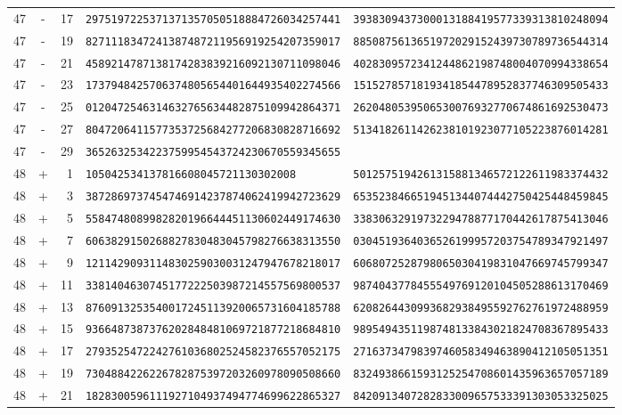\begin{longtable}{@{}rcrll@{}}
47&-&17&\texttt{2975197225371371357050518884726034257441}&\texttt{3938309437300013188419577339313810248094}\\
47&-&19&\texttt{8271118347241387487211956919254207359017}&\texttt{8850875613651972029152439730789736544314}\\
47&-&21&\texttt{4589214787138174283839216092130711098046}&\texttt{4028309572341244862198748004070994338654}\\
47&-&23&\texttt{1737948425706374805654401644935402274566}&\texttt{1515278571819341854478952837746309505433}\\
47&-&25&\texttt{0120472546314632765634482875109942864371}&\texttt{2620480539506530076932770674861692530473}\\
47&-&27&\texttt{8047206411577353725684277206830828716692}&\texttt{5134182611426238101923077105223876014281}\\
47&-&29&\texttt{3652632534223759954543724230670559345655}&\texttt{}\\
48&+&1&\texttt{105042534137816608045721130302008}&\texttt{5012575194261315881346572122611983374432}\\
48&+&3&\texttt{3872869737454746914237874062419942723629}&\texttt{6535238466519451344074442750425448459845}\\
48&+&5&\texttt{5584748089982820196644451130602449174630}&\texttt{3383063291973229478877170442617875413046}\\
48&+&7&\texttt{6063829150268827830483045798276638313550}&\texttt{0304519364036526199957203754789347921497}\\
48&+&9&\texttt{1211429093114830259030031247947678218017}&\texttt{6068072528798065030419831047669745799347}\\
48&+&11&\texttt{3381404630745177222503987214557569800537}&\texttt{9874043778455549769120104505288613170469}\\
48&+&13&\texttt{8760913253540017245113920065731604185788}&\texttt{6208264430993682938495592762761972488959}\\
48&+&15&\texttt{9366487387376202848481069721877218684810}&\texttt{9895494351198748133843021824708367895433}\\
48&+&17&\texttt{2793525472242761036802524582376557052175}&\texttt{2716373479839746058349463890412105051351}\\
48&+&19&\texttt{7304884226226782875397203260978090508660}&\texttt{8324938661593125254708601435963657057189}\\
48&+&21&\texttt{1828300596111927104937494774699622865327}&\texttt{8420913407282833009657533391303053325025}\\

\end{longtable}
